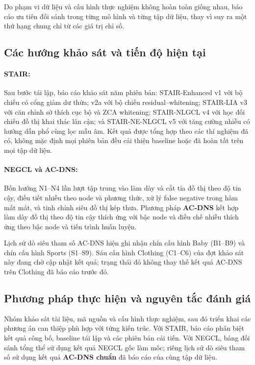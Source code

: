 Do phạm vi dữ liệu và cấu hình thực nghiệm không hoàn toàn giống nhau, báo cáo ưu tiên đối sánh trong từng mô hình và từng tập dữ liệu, thay vì suy ra một thứ hạng chung chỉ từ các giá trị chỉ số.

\subsection{Các hướng khảo sát và tiến độ hiện tại}

\paragraph{STAIR:}
Sau bước tái lập, báo cáo khảo sát năm phiên bản: STAIR-Enhanced v1 với bộ chiếu có cổng giảm dư thừa; v2a với bộ chiếu residual--whitening; STAIR-LIA v3 với căn chỉnh sở thích cục bộ và ZCA whitening; STAIR-NLGCL v4 với học đối chiếu đồ thị khai thác lân cận; và STAIR-NE-NLGCL v5 với tăng cường nhiễu có hướng dẫn phổ cùng lọc mẫu âm. Kết quả được tổng hợp theo các thí nghiệm đã có, không mặc định mọi phiên bản đều cải thiện baseline hoặc đã hoàn tất trên mọi tập dữ liệu.

\paragraph{NEGCL và AC-DNS:}
Bốn hướng N1--N4 lần lượt tập trung vào làm dày và cắt tỉa đồ thị theo độ tin cậy, điều tiết nhiễu theo node và phương thức, xử lý false negative trong hàm mất mát, và tinh chỉnh siêu đồ thị kép thưa. Phương pháp \textbf{AC-DNS} kết hợp làm dày đồ thị theo độ tin cậy thích ứng với bậc node và điều chế nhiễu thích ứng theo bậc node và tiến trình huấn luyện.

Lịch sử dò siêu tham số AC-DNS hiện ghi nhận chín cấu hình Baby (B1--B9) và chín cấu hình Sports (S1--S9). Sáu cấu hình Clothing (C1--C6) của đợt khảo sát này đang chờ cập nhật kết quả; trạng thái đó không thay thế kết quả AC-DNS trên Clothing đã báo cáo trước đó.

\subsection{Phương pháp thực hiện và nguyên tắc đánh giá}

Nhóm khảo sát tài liệu, mã nguồn và cấu hình thực nghiệm, sau đó triển khai các phương án can thiệp phù hợp với từng kiến trúc. Với STAIR, báo cáo phân biệt kết quả công bố, baseline tái lập và các phiên bản cải tiến. Với NEGCL, bảng đối sánh tổng thể sử dụng kết quả NEGCL gốc làm mốc; riêng lịch sử dò siêu tham số sử dụng kết quả \textbf{AC-DNS chuẩn} đã báo cáo của cùng tập dữ liệu.

